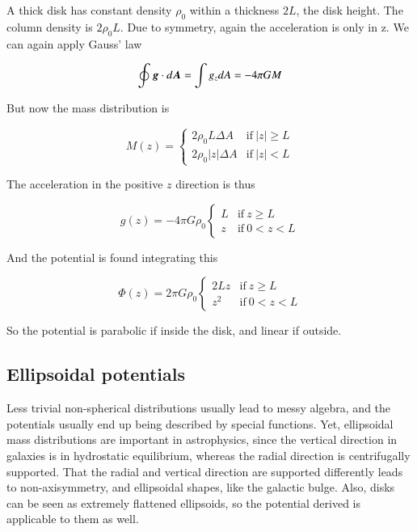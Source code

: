 A thick disk has constant density $\rho_0$ within a thickness $2L$, the disk height. The column density is $2\rho_0 L$. Due to symmetry, again the acceleration is only in z. We can again apply Gauss' law 

\begin{equation}
\oint {\boldsymbol{g}} \cdot d{\boldsymbol{A}} = \int g_z dA =  -4\pi G M 
\end{equation}

But now the mass distribution is 

\begin{equation}
M(z) = \left\{ \begin{array}{cc} 
2\rho_0 L  \Delta A & \mathrm{if} \ |z| \geq L \\
2\rho_0 |z| \Delta A  & \mathrm{if} \ |z| < L
\end{array} \right.
\end{equation}

The acceleration in the positive $z$ direction is thus 

\begin{equation}
g(z) = -4\pi G \rho_0 \left\{ \begin{array}{cc} 
L & \mathrm{if} \ z \geq L \\
z & \mathrm{if} \ 0 < z < L
\end{array} \right.
\end{equation}

And the potential is found integrating this 


\begin{equation}
\varPhi(z) = 2\pi G \rho_0 \left\{ \begin{array}{cc} 
2Lz & \mathrm{if} \ z \geq L \\
z^2  & \mathrm{if} \ 0 < z < L
\end{array} \right.
\end{equation}


So the potential is parabolic if inside the disk, and linear if outside.


\subsection{Ellipsoidal potentials}

Less trivial non-spherical distributions usually lead to messy algebra, and the potentials usually end up being described by special functions. Yet, ellipsoidal mass distributions are important in astrophysics, since the vertical direction in galaxies is in hydrostatic equilibrium, whereas the radial direction is centrifugally supported. That the radial and vertical direction are supported differently leads to non-axisymmetry, and ellipsoidal shapes, like the galactic bulge. Also, disks can be seen as extremely flattened ellipsoids, so the potential derived is applicable to them as well. 
    


